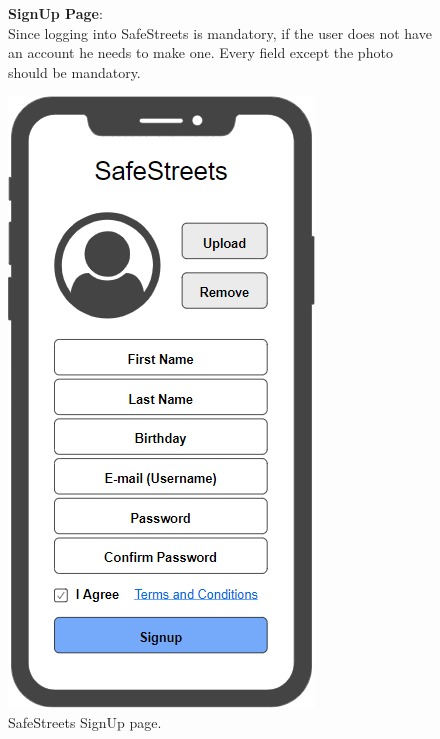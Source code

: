 \begin{figure}
	\begin{flushleft}
		\textbf{SignUp Page}:\\
		Since logging into SafeStreets is mandatory, if the user does not have an account he needs to make one. Every field except the photo should be mandatory.
	\end{flushleft}
	\centering
	\includegraphics[width=0.6\linewidth]{images/mockups/signup}
	\caption{SafeStreets SignUp page.}
	\label{fig:signup}
\end{figure}
\clearpage
